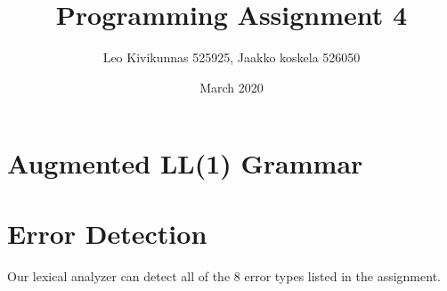 \documentclass{article}
\title{Programming Assignment 4}
\author{Leo Kivikunnas 525925, Jaakko koskela 526050}
\date{March 2020}
\begin{document}
\maketitle

\section{Augmented LL(1) Grammar}



\section{Error Detection}

Our lexical analyzer can detect all of the 8 error types listed in the assignment.
\end{document}
